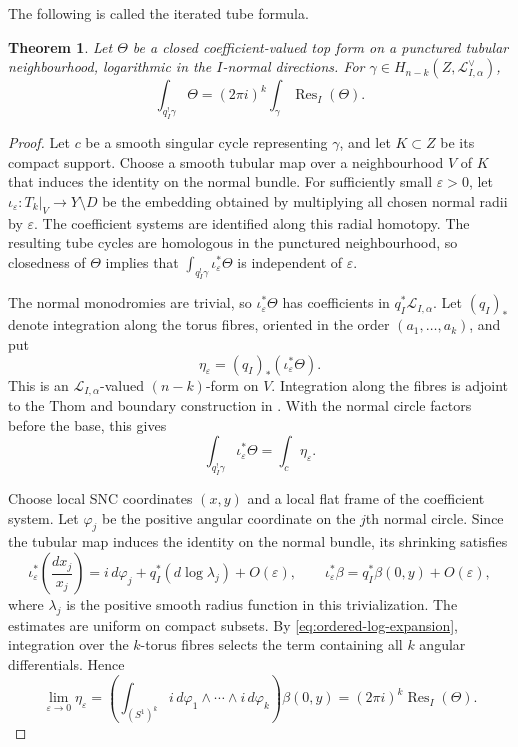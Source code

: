 \documentclass[12pt]{amsart}
\numberwithin{equation}{section}
\theoremstyle{plain}
\newtheorem{theorem}{Theorem}[section]
\theoremstyle{definition}
\theoremstyle{remark}
\theoremstyle{definition}
\DeclareMathOperator{\Res}{Res}
\newcommand{\Lcal}{\mathscr L}
\begin{document}
The following is called the iterated tube formula. 

\begin{theorem}
\label{thm:iterated-tube-formula}
Let $\Theta$ be a closed coefficient-valued top form on a punctured tubular neighbourhood, logarithmic in the $I$-normal directions. For $\gamma\in H_{n-k}(Z,\Lcal_{I,\alpha}^\vee)$,
\begin{equation}\label{eq:iterated-tube-formula}
 \int_{q_I^!\gamma}\Theta=(2\pi i)^k
 \int_\gamma\Res_I(\Theta).
\end{equation}
\end{theorem}

\begin{proof}
Let $c$ be a smooth singular cycle representing $\gamma$, and let $K\subset Z$ be its compact support. Choose a smooth tubular map over a neighbourhood $V$ of $K$ that induces the identity on the normal bundle. For sufficiently small $\varepsilon>0$, let $\iota_\varepsilon:T_k|_V\to Y\setminus D$ be the embedding obtained by multiplying all chosen normal radii by $\varepsilon$. The coefficient systems are identified along this radial homotopy. The resulting tube cycles are homologous in the punctured neighbourhood, so closedness of $\Theta$ implies that $\int_{q_I^!\gamma}\iota_\varepsilon^*\Theta$ is independent of $\varepsilon$.

The normal monodromies are trivial, so $\iota_\varepsilon^*\Theta$ has coefficients in $q_I^*\Lcal_{I,\alpha}$. Let $(q_I)_*$ denote integration along the torus fibres, oriented in the order $(a_1,\ldots,a_k)$, and put
\[
\eta_\varepsilon=(q_I)_*(\iota_\varepsilon^*\Theta).
\]
This is an $\Lcal_{I,\alpha}$-valued $(n-k)$-form on $V$. Integration along the fibres is adjoint to the Thom and boundary construction in . With the normal circle factors before the base, this gives
\[
\int_{q_I^!\gamma}\iota_\varepsilon^*\Theta
=\int_c\eta_\varepsilon.
\]

Choose local SNC coordinates $(x,y)$ and a local flat frame of the coefficient system. Let $\varphi_j$ be the positive angular coordinate on the $j$th normal circle. Since the tubular map induces the identity on the normal bundle, its shrinking satisfies
\[
\iota_\varepsilon^*\left(\frac{dx_j}{x_j}\right)
=
i\,d\varphi_j+q_I^*(d\log\lambda_j)+O(\varepsilon),
\qquad
\iota_\varepsilon^*\beta
=
q_I^*\beta(0,y)+O(\varepsilon),
\]
where $\lambda_j$ is the positive smooth radius function in this trivialization. The estimates are uniform on compact subsets. By \eqref{eq:ordered-log-expansion}, integration over the $k$-torus fibres selects the term containing all $k$ angular differentials. Hence
\[
\lim_{\varepsilon\to0}\eta_\varepsilon
=
\left(
\int_{(S^1)^k}
i\,d\varphi_1\wedge\cdots\wedge i\,d\varphi_k
\right)
\beta(0,y)
=
(2\pi i)^k\Res_I(\Theta).
\]


\end{proof}
\end{document}
